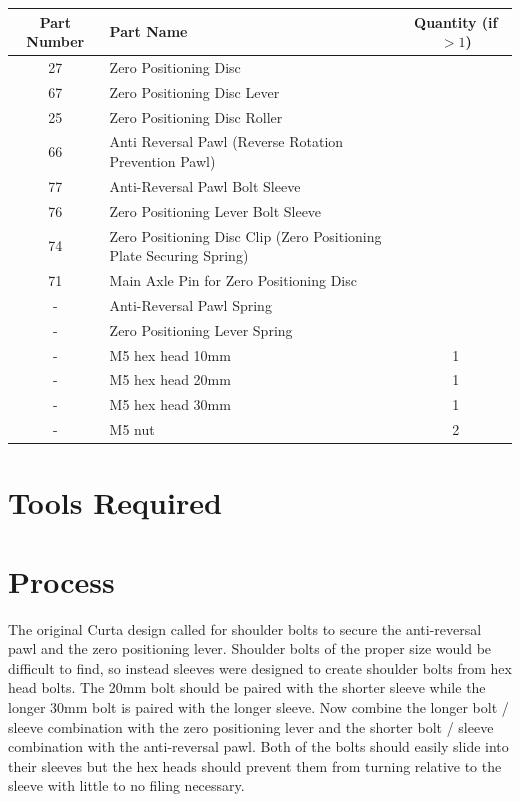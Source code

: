 \documentclass[openany]{book}
\begin{document}
\begin{table}[!ht]
	\centering
	\begin{tabular}{clc}
		Part Number & Part Name & Quantity (if $>1$) \\ \hline
		27 & Zero Positioning Disc & \\
		67 & Zero Positioning Disc Lever & \\
		25 & Zero Positioning Disc Roller & \\
		66 & Anti Reversal Pawl (Reverse Rotation Prevention Pawl) & \\
		77 & Anti-Reversal Pawl Bolt Sleeve & \\
		76 & Zero Positioning Lever Bolt Sleeve & \\
		74 & Zero Positioning Disc Clip (Zero Positioning Plate Securing Spring) & \\
		71 & Main Axle Pin for Zero Positioning Disc & \\ \hline \hline
		- & Anti-Reversal Pawl Spring & \\
		- & Zero Positioning Lever Spring & \\ \hline \hline
		- & M5 hex head 10mm & 1 \\
		- & M5 hex head 20mm & 1 \\
		- & M5 hex head 30mm & 1 \\
		- & M5 nut & 2
	\end{tabular}
\end{table}

\section{Tools Required}

\section{Process}
The original Curta design called for shoulder bolts to secure the anti-reversal pawl and the zero positioning lever. Shoulder bolts of the proper size would be difficult to find, so instead sleeves were designed to create shoulder bolts from hex head bolts. The 20mm bolt should be paired with the shorter sleeve while the longer 30mm bolt is paired with the longer sleeve. Now combine the longer bolt / sleeve combination with the zero positioning lever and the shorter bolt / sleeve combination with the anti-reversal pawl. Both of the bolts should easily slide into their sleeves but the hex heads should prevent them from turning relative to the sleeve with little to no filing necessary.
\end{document}
